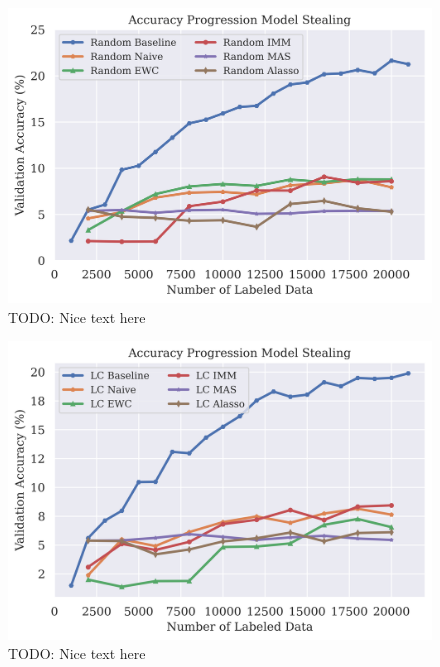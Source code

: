 \begin{figure}[h]
    \centering
    \includegraphics[width=0.8\linewidth]{images/results_CALMS/cifar100_label_random.png}
    \caption[Accuracy Comparison for Model Stealing on CIFAR100 using the top1-label and the Active Learning strategy Random]{TODO: Nice text here}
    \label{fig:CALMSCIFAR100LabelRandom}
\end{figure}

\begin{figure}[h]
    \centering
    \includegraphics[width=0.8\linewidth]{images/results_CALMS/cifar100_label_lc.png}
    \caption[Accuracy Comparison for Model Stealing on CIFAR100 using the top1-label and the Active Learning strategy LC]{TODO: Nice text here}
    \label{fig:CALMSCIFAR100LabelLC}
\end{figure}

